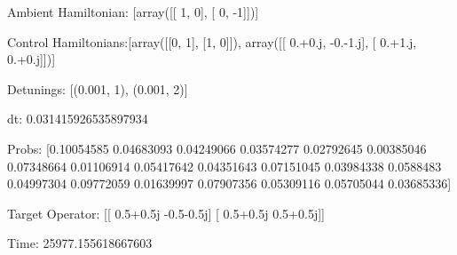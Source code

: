 \documentclass{article}
\begin{document}
    

\newpage

Ambient Hamiltonian: [array([[ 1,  0],
       [ 0, -1]])]

Control Hamiltonians:[array([[0, 1],
       [1, 0]]), array([[ 0.+0.j, -0.-1.j],
       [ 0.+1.j,  0.+0.j]])]

Detunings: [(0.001, 1), (0.001, 2)]

 dt: 0.031415926535897934

Probs: [0.10054585 0.04683093 0.04249066 0.03574277 0.02792645 0.00385046
 0.07348664 0.01106914 0.05417642 0.04351643 0.07151045 0.03984338
 0.0588483  0.04997304 0.09772059 0.01639997 0.07907356 0.05309116
 0.05705044 0.03685336]

Target Operator: [[ 0.5+0.5j -0.5-0.5j]
 [ 0.5+0.5j  0.5+0.5j]]

Time: 25977.155618667603
\end{document}
